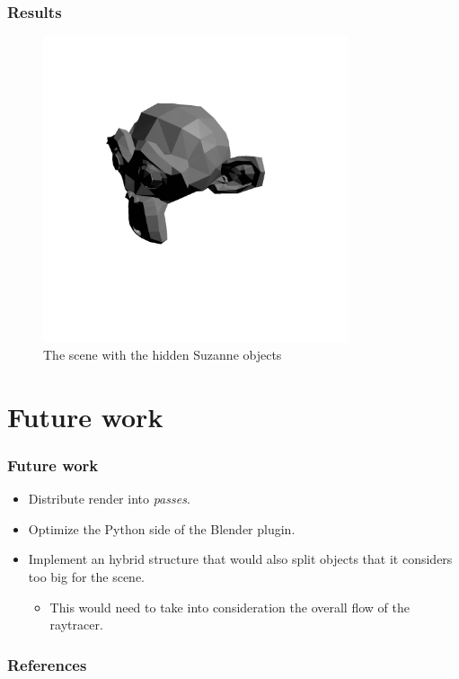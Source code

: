 \documentclass{beamer}
\newenvironment{figure*}%
{\begin{figure}}
{\end{figure}}
\begin{document}
\begin{frame}
  \frametitle{Results}
\begin{figure}
\centering
\includegraphics[width=0.8\textwidth]{suzanne.png}
\caption{The scene with the hidden Suzanne objects}
\end{figure}
\end{frame}


\section{Future work}
\begin{frame}
  \frametitle{Future work}

\begin{itemize}
\item Distribute render into \emph{passes}.
\item Optimize the Python side of the Blender plugin.
\item Implement an hybrid structure that would also split objects that it considers too big for the scene.
\begin{itemize}
\item This would need to take into consideration the overall flow of
  the raytracer.
\end{itemize}
\end{itemize}

\end{frame}



\begin{frame}[allowframebreaks]
\frametitle{References}

\end{frame}
\end{document}
